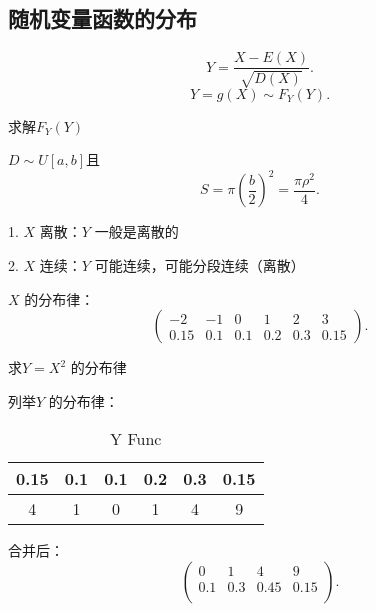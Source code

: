 \subsection{随机变量函数的分布}%
\label{sub:随机变量函数的分布}
\begin{eg}
	 \[
		Y=\frac{X-E\left( X \right) }{\sqrt{D\left( X \right) } }
	.\] 
	\[
		Y=g\left( X \right) \sim F_{Y}\left( Y \right) 
	.\] 

	求解$F_{Y}\left( Y \right) $
\end{eg}
\begin{eg}
	$D\sim U[a,b]$且
	 \[
		S=\pi\left( \frac{b}{2} \right) ^2 = \frac{\pi\rho^2}{4}
	.\] 
\end{eg}
1. $X$ 离散：$Y$ 一般是离散的

2. $X$ 连续：$Y$ 可能连续，可能分段连续（离散）
\begin{eg}
	$X$ 的分布律：
	\[
		\begin{pmatrix}
			-2&-1&0&1&2&3\\
			0.15&0.1&0.1&0.2&0.3&0.15
		\end{pmatrix}
	.\] 

	求$Y=X^2$ 的分布律

	列举$Y$ 的分布律：
	\begin{table}[htpb]
		\centering
		\caption{Y Func}
		\label{tab:Y-Func}
		\begin{tabular}{cccccc}
		\toprule
		0.15 & 0.1 & 0.1 & 0.2 & 0.3 & 0.15\\
		\midrule
		4 & 1 & 0 & 1 & 4 & 9\\
		\bottomrule
		\end{tabular}
	\end{table}
	合并后：
	\[
		\begin{pmatrix}
			0 & 1 & 4 & 9\\
			0.1 & 0.3 & 0.45 & 0.15\\
		\end{pmatrix}
	.\] 
\end{eg}

